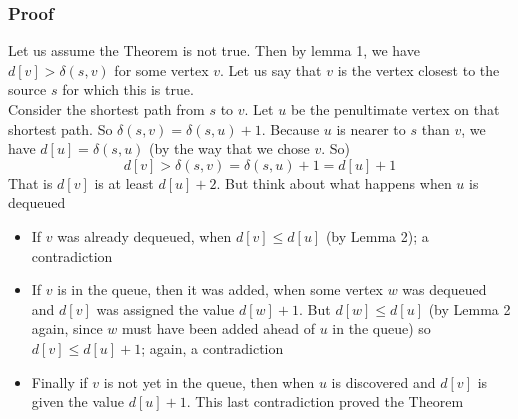 \documentclass{article}[18pt]
\begin{document}
\subsubsection{Proof}
Let us assume the Theorem is not true. Then by lemma 1, we have $d[v]>\delta(s,v)$ for some vertex $v$. Let us say that $v$ is the vertex closest to the source $s$ for which this is true.\\
Consider the shortest path from $s$ to $v$. Let $u$ be the penultimate vertex on that shortest path. So $\delta(s,v)=\delta(s,u)+1$. Because $u$ is nearer to $s$ than $v$, we have $d[u]=\delta(s,u)$ (by the way that we chose $v$. So)
$$d [ v ] > \delta ( s , v ) = \delta ( s , u ) + 1 = d [ u ] + 1$$
That is $d[v]$ is at least $d[u]+2$. But think about what happens when $u$ is dequeued
\begin{itemize}
	\item If $v$ was already dequeued, when $d[v]\leqslant d[u]$ (by Lemma 2); a contradiction
	\item If $v$ is in the queue, then it was added, when some vertex $w$ was dequeued and $d[v]$ was assigned the value $d[w]+1$. But $d[w]\leqslant d[u]$ (by Lemma 2 again, since $w$ must have been added ahead of $u$ in the queue) so $d[v]\leqslant d[u]+1$; again, a contradiction
	\item Finally if $v$ is not yet in the queue, then when $u$ is discovered and $d[v]$ is given the value $d[u]+1$. This last contradiction proved the Theorem
\end{itemize}
\end{document}
